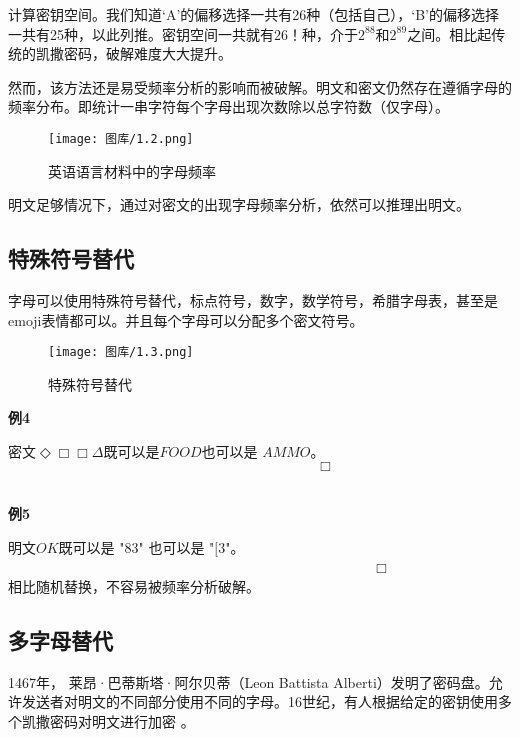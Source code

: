 \documentclass{article}
\begin{document}
计算密钥空间。我们知道‘A’的偏移选择一共有26种（包括自己），‘B’的偏移选择一共有25种，以此列推。密钥空间一共就有$26！$种，介于$2^{88}$和$2^{89}$之间。相比起传统的凯撒密码，破解难度大大提升。

然而，该方法还是易受频率分析的影响而被破解。明文和密文仍然存在遵循字母的频率分布。即统计一串字符每个字母出现次数除以总字符数（仅字母）。
\begin{figure}[H] %
\centering %
\texttt{[image: 图库/1.2.png]} %
\caption{英语语言材料中的字母频率} %
\label{Fig.main2} %
\end{figure}

明文足够情况下，通过对密文的出现字母频率分析，依然可以推理出明文。

\clearpage

\subsection{特殊符号替代}

字母可以使用特殊符号替代，标点符号，数字，数学符号，希腊字母表，甚至是emoji表情都可以。并且每个字母可以分配多个密文符号。

\begin{figure}[H] %
\centering %
\texttt{[image: 图库/1.3.png]} %
\caption{特殊符号替代} %
\label{Fig.main2} %
\end{figure}

\textbf{例4}

密文$\Diamond\Box \Box \Delta $既可以是$FOOD$也可以是 $AMMO$。 $\qquad\qquad\qquad\qquad\qquad\qquad\qquad\qquad\qquad\qquad\qquad \Box$

~\\

\textbf{例5}

明文$OK$既可以是 "$83$" 也可以是 "$[3$"。 $\qquad\qquad\qquad\qquad\qquad\qquad\qquad\qquad\qquad\qquad\qquad\qquad\qquad \Box$
~\\

相比随机替换，不容易被频率分析破解。
~\\

\clearpage

\subsection{多字母替代}
1467年， 莱昂·巴蒂斯塔·阿尔贝蒂（Leon Battista Alberti）发明了密码盘。允许发送者对明文的不同部分使用不同的字母。16世纪，有人根据给定的密钥使用多个凯撒密码对明文进行加密
。
\end{document}
